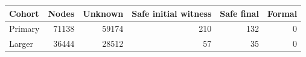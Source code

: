 \begin{tabular}{@{}lrrrrr@{}}\toprule
Cohort & Nodes & Unknown & Safe initial witness & Safe final & Formal\\\midrule
Primary & 71138 & 59174 & 210 & 132 & 0\\
Larger & 36444 & 28512 & 57 & 35 & 0\\
\bottomrule
\end{tabular}
